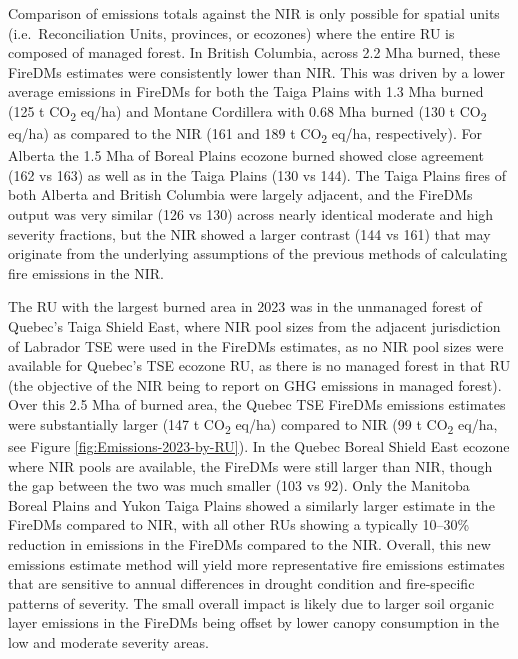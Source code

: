 \documentclass[, manuscript]{copernicus}
\begin{document}
Comparison of emissions totals against the NIR is only possible for
spatial units (i.e.~Reconciliation Units, provinces, or ecozones) where
the entire RU is composed of managed forest. In British Columbia, across
2.2 Mha burned, these FireDMs estimates were consistently lower than
NIR. This was driven by a lower average emissions in FireDMs for both
the Taiga Plains with 1.3 Mha burned (125 t CO\textsubscript{2} eq/ha)
and Montane Cordillera with 0.68 Mha burned (130 t CO\textsubscript{2}
eq/ha) as compared to the NIR (161 and 189 t CO\textsubscript{2} eq/ha,
respectively). For Alberta the 1.5 Mha of Boreal Plains ecozone burned
showed close agreement (162 vs 163) as well as in the Taiga Plains (130
vs 144). The Taiga Plains fires of both Alberta and British Columbia
were largely adjacent, and the FireDMs output was very similar (126 vs
130) across nearly identical moderate and high severity fractions, but
the NIR showed a larger contrast (144 vs 161) that may originate from
the underlying assumptions of the previous methods of calculating fire
emissions in the NIR.

The RU with the largest burned area in 2023 was in the unmanaged forest
of Quebec's Taiga Shield East, where NIR pool sizes from the adjacent
jurisdiction of Labrador TSE were used in the FireDMs estimates, as no
NIR pool sizes were available for Quebec's TSE ecozone RU, as there is
no managed forest in that RU (the objective of the NIR being to report
on GHG emissions in managed forest). Over this 2.5 Mha of burned area,
the Quebec TSE FireDMs emissions estimates were substantially larger
(147 t CO\textsubscript{2} eq/ha) compared to NIR (99 t
CO\textsubscript{2} eq/ha, see Figure \ref{fig:Emissions-2023-by-RU}).
In the Quebec Boreal Shield East ecozone where NIR pools are available,
the FireDMs were still larger than NIR, though the gap between the two
was much smaller (103 vs 92). Only the Manitoba Boreal Plains and Yukon
Taiga Plains showed a similarly larger estimate in the FireDMs compared
to NIR, with all other RUs showing a typically 10--30\% reduction in
emissions in the FireDMs compared to the NIR. Overall, this new
emissions estimate method will yield more representative fire emissions
estimates that are sensitive to annual differences in drought condition
and fire-specific patterns of severity. The small overall impact is
likely due to larger soil organic layer emissions in the FireDMs being
offset by lower canopy consumption in the low and moderate severity
areas.
\end{document}
